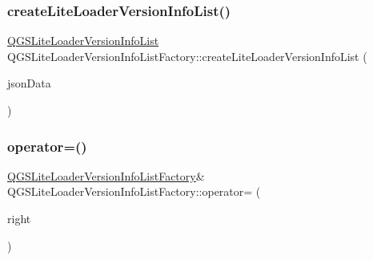 \subsubsection{\texorpdfstring{create\+Lite\+Loader\+Version\+Info\+List()}{createLiteLoaderVersionInfoList()}}
{\footnotesize\ttfamily \mbox{\hyperlink{class_q_g_s_lite_loader_version_info_list}{Q\+G\+S\+Lite\+Loader\+Version\+Info\+List}} Q\+G\+S\+Lite\+Loader\+Version\+Info\+List\+Factory\+::create\+Lite\+Loader\+Version\+Info\+List (\begin{DoxyParamCaption}\item[{const Q\+Byte\+Array \&}]{json\+Data }\end{DoxyParamCaption})}

\mbox{\label{class_q_g_s_lite_loader_version_info_list_factory_ac05cbb2d49e7f805563ccf4165914096}} 
\subsubsection{\texorpdfstring{operator=()}{operator=()}\hspace{0.1cm}{\footnotesize\ttfamily [1/2]}}
{\footnotesize\ttfamily \mbox{\hyperlink{class_q_g_s_lite_loader_version_info_list_factory}{Q\+G\+S\+Lite\+Loader\+Version\+Info\+List\+Factory}}\& Q\+G\+S\+Lite\+Loader\+Version\+Info\+List\+Factory\+::operator= (\begin{DoxyParamCaption}\item[{const \mbox{\hyperlink{class_q_g_s_lite_loader_version_info_list_factory}{Q\+G\+S\+Lite\+Loader\+Version\+Info\+List\+Factory}} \&}]{right }\end{DoxyParamCaption})\hspace{0.3cm}{\ttfamily [delete]}}

\mbox{\label{class_q_g_s_lite_loader_version_info_list_factory_ade4e0177906ed7c1cc25f648c40c1d72}} 

